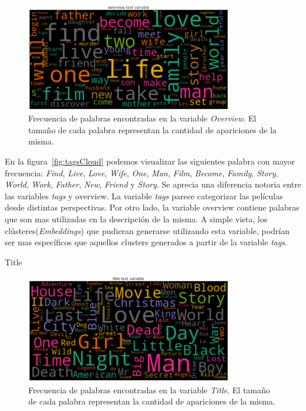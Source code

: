 \documentclass[11pt,a4paper,twoside]{thesis}
\begin{document}
\begin{figure}[h!]
	\centering
	\includegraphics[width=9cm]{./images/Cloud-Overview.png}
	\caption{Frecuencia de palabras encontradas en la variable \textit{Overview}. El tamaño de cada palabra representan la cantidad de apariciones de la misma.}
	\label{fig:overviewCloud}
\end{figure}

En la figura~\ref{fig:tagsCloud} podemos visualizar las siguientes palabra con
mayor frecuencia: \textit{Find}, \textit{Live}, \textit{Love}, \textit{Wife},
\textit{One}, \textit{Man}, \textit{Film}, \textit{Become}, \textit{Family},
\textit{Story}, \textit{World}, \textit{Work}, \textit{Father}, \textit{New},
\textit{Friend} y \textit{Story}. Se aprecia una diferencia notoria entre las
variables \textit{tags} y overview. La variable \textit{tags} parece
categorizar las películas desde distintas perspectivas. Por otro lado, la
variable overview contiene palabras que son mas utilizadas en la descripción de
la misma. A simple vista, los clústeres(\textit{Embeddings}) que pudieran
generarse utilizando esta variable, podrían ser mas específicos que aquellos
clusters generados a partir de la variable \textit{tags}.

\begin{description}
	\item[Title]
\end{description}

\begin{figure}[h!]
	\centering
	\includegraphics[width=9cm]{./images/Cloud-Title.png}
	\caption{Frecuencia de palabras encontradas en la variable \textit{Title}. El tamaño de cada palabra representan la cantidad de apariciones de la misma.}
	\label{fig:titleCloud}
\end{figure}
\end{document}
